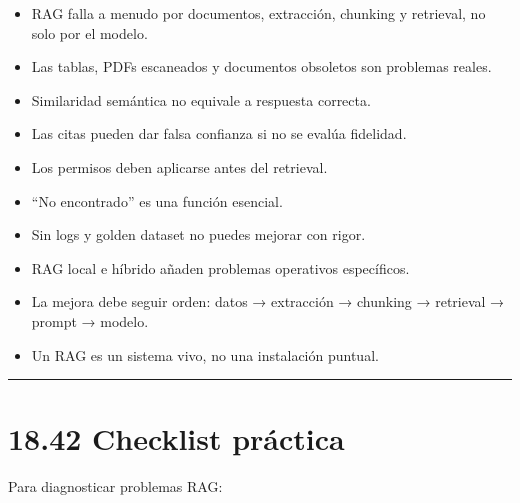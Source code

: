 \begin{itemize}
\tightlist
\item
  RAG falla a menudo por documentos, extracción, chunking y retrieval,
  no solo por el modelo.
\item
  Las tablas, PDFs escaneados y documentos obsoletos son problemas
  reales.
\item
  Similaridad semántica no equivale a respuesta correcta.
\item
  Las citas pueden dar falsa confianza si no se evalúa fidelidad.
\item
  Los permisos deben aplicarse antes del retrieval.
\item
  ``No encontrado'' es una función esencial.
\item
  Sin logs y golden dataset no puedes mejorar con rigor.
\item
  RAG local e híbrido añaden problemas operativos específicos.
\item
  La mejora debe seguir orden: datos → extracción → chunking → retrieval
  → prompt → modelo.
\item
  Un RAG es un sistema vivo, no una instalación puntual.
\end{itemize}

\begin{center}\rule{0.5\linewidth}{0.5pt}\end{center}

\section{18.42 Checklist práctica}\label{checklist-pruxe1ctica-17}

Para diagnosticar problemas RAG:

